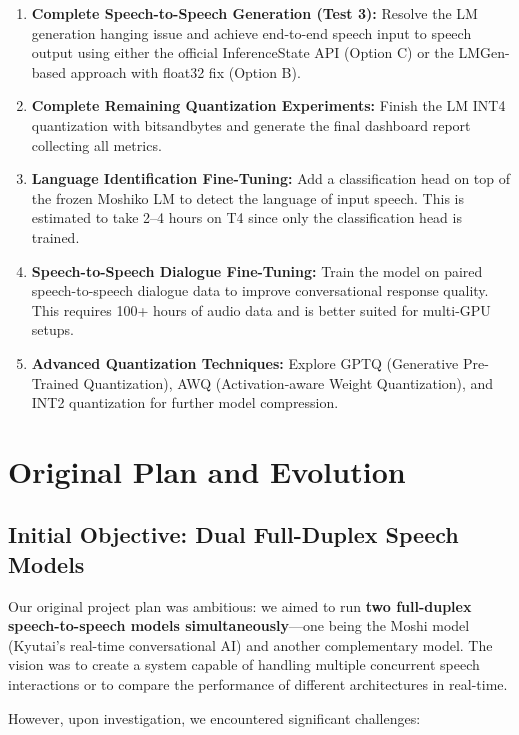 \documentclass[12pt,a4paper]{report}
\begin{document}
\begin{enumerate}
    \item \textbf{Complete Speech-to-Speech Generation (Test 3):} Resolve the LM generation hanging issue and achieve end-to-end speech input to speech output using either the official InferenceState API (Option C) or the LMGen-based approach with float32 fix (Option B).
    
    \item \textbf{Complete Remaining Quantization Experiments:} Finish the LM INT4 quantization with bitsandbytes and generate the final dashboard report collecting all metrics.
    
    \item \textbf{Language Identification Fine-Tuning:} Add a classification head on top of the frozen Moshiko LM to detect the language of input speech. This is estimated to take 2--4 hours on T4 since only the classification head is trained.
    
    \item \textbf{Speech-to-Speech Dialogue Fine-Tuning:} Train the model on paired speech-to-speech dialogue data to improve conversational response quality. This requires 100+ hours of audio data and is better suited for multi-GPU setups.
    
    \item \textbf{Advanced Quantization Techniques:} Explore GPTQ (Generative Pre-Trained Quantization), AWQ (Activation-aware Weight Quantization), and INT2 quantization for further model compression.
\end{enumerate}

\chapter{Original Plan and Evolution}

\section{Initial Objective: Dual Full-Duplex Speech Models}
Our original project plan was ambitious: we aimed to run \textbf{two full-duplex speech-to-speech models simultaneously}---one being the Moshi model (Kyutai's real-time conversational AI) and another complementary model. The vision was to create a system capable of handling multiple concurrent speech interactions or to compare the performance of different architectures in real-time.

However, upon investigation, we encountered significant challenges:
\end{document}
